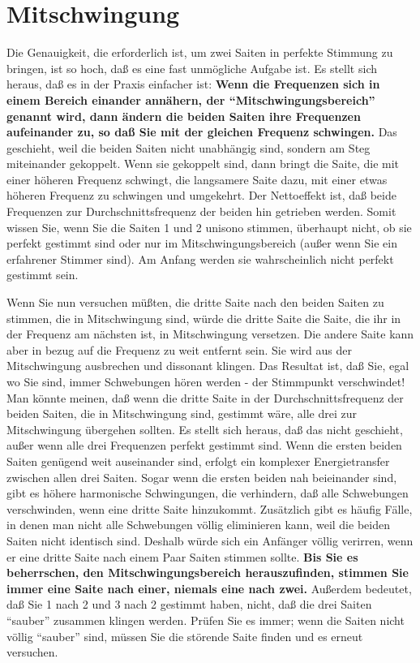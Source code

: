 
\hypertarget{c2_5e}{}
\section{Mitschwingung}\hypertarget{c2_5_mits}{} 

Die Genauigkeit, die erforderlich ist, um zwei Saiten in perfekte Stimmung zu bringen, ist so hoch, daß es eine fast unmögliche Aufgabe ist.
Es stellt sich heraus, daß es in der Praxis einfacher ist: \textbf{Wenn die Frequenzen sich in einem Bereich einander annähern, der \enquote{Mitschwingungsbereich} genannt wird, dann ändern die beiden Saiten ihre Frequenzen aufeinander zu, so daß Sie mit der gleichen Frequenz schwingen.}
Das geschieht, weil die beiden Saiten nicht unabhängig sind, sondern am Steg miteinander gekoppelt.
Wenn sie gekoppelt sind, dann bringt die Saite, die mit einer höheren Frequenz schwingt, die langsamere Saite dazu, mit einer etwas höheren Frequenz zu schwingen und umgekehrt.
Der Nettoeffekt ist, daß beide Frequenzen zur Durchschnittsfrequenz der beiden hin getrieben werden.
Somit wissen Sie, wenn Sie die Saiten 1 und 2 unisono stimmen, überhaupt nicht, ob sie perfekt gestimmt sind oder nur im Mitschwingungsbereich (außer wenn Sie ein erfahrener Stimmer sind).
Am Anfang werden sie wahrscheinlich nicht perfekt gestimmt sein.

Wenn Sie nun versuchen müßten, die dritte Saite nach den beiden Saiten zu stimmen, die in Mitschwingung sind, würde die dritte Saite die Saite, die ihr in der Frequenz am nächsten ist, in Mitschwingung versetzen.
Die andere Saite kann aber in bezug auf die Frequenz zu weit entfernt sein.
Sie wird aus der Mitschwingung ausbrechen und dissonant klingen.
Das Resultat ist, daß Sie, egal wo Sie sind, immer Schwebungen hören werden - der Stimmpunkt verschwindet!
Man könnte meinen, daß wenn die dritte Saite in der Durchschnittsfrequenz der beiden Saiten, die in Mitschwingung sind, gestimmt wäre, alle drei zur Mitschwingung übergehen sollten.
Es stellt sich heraus, daß das nicht geschieht, außer wenn alle drei Frequenzen perfekt gestimmt sind.
Wenn die ersten beiden Saiten genügend weit auseinander sind, erfolgt ein komplexer Energietransfer zwischen allen drei Saiten.
Sogar wenn die ersten beiden nah beieinander sind, gibt es höhere harmonische Schwingungen, die verhindern, daß alle Schwebungen verschwinden, wenn eine dritte Saite hinzukommt.
Zusätzlich gibt es häufig Fälle, in denen man nicht alle Schwebungen völlig eliminieren kann, weil die beiden Saiten nicht identisch sind.
Deshalb würde sich ein Anfänger völlig verirren, wenn er eine dritte Saite nach einem Paar Saiten stimmen sollte.
\textbf{Bis Sie es beherrschen, den Mitschwingungsbereich herauszufinden, stimmen Sie immer eine Saite nach einer, niemals eine nach zwei.}
Außerdem bedeutet, daß Sie 1 nach 2 und 3 nach 2 gestimmt haben, nicht, daß die drei Saiten \enquote{sauber} zusammen klingen werden.
Prüfen Sie es immer; wenn die Saiten nicht völlig \enquote{sauber} sind, müssen Sie die störende Saite finden und es erneut versuchen.

